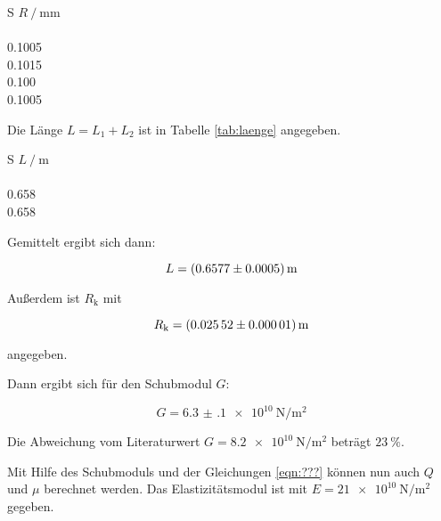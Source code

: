 \begin{table}[h]
  \centering
  \caption{Messwerte des Radius des Drahts.}
  \label{tab:raddraht}
  \begin{tabular}{S}
    \toprule
    {$R\:/\:\si{\milli\meter}$} \\
     \\
    0.1005 \\
    0.1015 \\
    0.100 \\
    0.1005 \\
    \bottomrule
  \end{tabular}
\end{table}

Die Länge $L = L_1 + L_2$ ist in Tabelle \ref{tab:laenge} angegeben.

\begin{table}[h]
  \centering
  \caption{Messwerte der Länge des Drahts.}
  \label{tab:laenge}
  \begin{tabular}{S}
    \toprule
    {$L\:/\:\si{\meter}$} \\
     \\
    0.658 \\
    0.658 \\
    \bottomrule
  \end{tabular}
\end{table}

Gemittelt ergibt sich dann:

\begin{equation*}
  L = \SI{0.6577 +- 0.0005}{\meter}
\end{equation*}

Außerdem ist $R_{\text{k}}$ mit

\begin{equation*}
  R_{\text{k}} = \SI{0.02552 +- 0.00001}{\meter}
\end{equation*}

angegeben.

Dann ergibt sich für den Schubmodul $G$:

\begin{equation*}
  G = \SI{6.3(1)e10}{\newton\per\meter\squared}
\end{equation*}

Die Abweichung vom Literaturwert $G = \SI{8.2e10}{\newton\per\meter\squared}$
beträgt $\SI{23}{\percent}$.

Mit Hilfe des Schubmoduls und der Gleichungen \eqref{eqn:???}
können nun auch $Q$ und $\mu$ berechnet werden. Das Elastizitätsmodul ist mit
$E = \SI{21e10}{\newton\per\meter\squared}$ gegeben.

